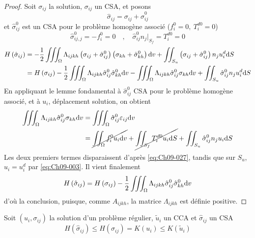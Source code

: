\begin{proof}
    Soit $\sigma_{ij}$ la solution, $\sigma_{ij}$ un CSA, et posons
    \begin{equation}
        \hat{\sigma}_{ij} = \sigma_{ij} + \hat{\sigma}_{ij}^0
        \label{eq:Ch09-026}
    \end{equation}
    et $\hat{\sigma}_{ij}^0$ est un CSA pour le problème homogène associé ($f_i^0 = 0,\ T_i^{d0} = 0$)
    \begin{equation}
        \hat{\sigma}_{ij,j}^0 = -f_i^0 = 0 \quad,\quad \hat{\sigma}_{ij}^0 n_j |_{S_f} = T_i^{d0} = 0
        \label{eq:Ch09-027}
    \end{equation}
    \begin{align*}
        H\left( \hat{\sigma}_{ij} \right) &= - \frac{1}{2} \iiint_{\Omega} \Lambda_{ijkh} \left( \sigma_{ij} + \hat{\sigma}_{ij}^0 \right) \left( \sigma_{kh} + \hat{\sigma}_{kh}^0 \right) \mathrm{d} v + \iint_{S_u} \left( \sigma_{ij} + \hat{\sigma}_{ij}^0 \right) n_j u_i^d \mathrm{d} S \\
        &= H\left( \sigma_{ij} \right) - \frac{1}{2} \iiint_{\Omega} \Lambda_{ijkh} \hat{\sigma}_{ij}^0 \hat{\sigma}_{kh}^0 \mathrm{d} v - \iiint_{\Omega} \Lambda_{ijkh} \hat{\sigma}_{ij}^0 \sigma_{kh} \mathrm{d} v + \iint_{S_u} \hat{\sigma}^0_{ij} n_j u_i^d \mathrm{d} S
    \end{align*}
    En appliquant le lemme fondamental à $\hat{\sigma}_{ij}^0$ CSA pour le problème homogène associé, et à $u_i$, déplacement solution, on obtient
    \begin{align*}
        \iiint_{\Omega} \Lambda_{ijkh} \hat{\sigma}_{ij}^0 \sigma_{kh} \mathrm{d} v &= \iiint_{\Omega} \hat{\sigma}_{ij}^0 \varepsilon_{ij} \mathrm{d} v \\
        &= \cancel{\iint_{\Omega} f_i^0 u_i \mathrm{d} v} + \cancel{\iint_{S_f} T_i^{d0} u_i \mathrm{d} S} + \iint_{S_u} \hat{\sigma}_{ij}^0 n_j u_i \mathrm{d} S
    \end{align*}
    Les deux premiers termes disparaissent d'après \eqref{eq:Ch09-027}, tandis que sur $S_u$, $u_i=u_i^d$ par \eqref{eq:Ch09-003}.
    Il vient finalement 
    \begin{equation}
        H \left( \hat{\sigma}_{ij} \right) = H \left( \sigma_{ij} \right) - \frac{1}{2} \iiint_{\Omega} \Lambda_{ijkh} \hat{\sigma}_{ij}^0 \hat{\sigma}_{kh}^0 \mathrm{d} v
        \label{eq:Ch09-028}
    \end{equation}
    d'où la conclusion, puisque, comme $A_{ijkh}$, la matrice $\Lambda_{ijkh}$ est définie positive.
\end{proof}
\begin{thm}
    Soit $\left( u_i, \sigma_{ij} \right)$ la solution d'un problème régulier, $\tilde{u}_i$ un CCA et $\hat{\sigma}_{ij}$ un CSA
    \begin{equation}
        H \left( \hat{\sigma}_{ij} \right) \leq H \left( \sigma_{ij} \right) = K \left( u_i \right) \leq K \left( \tilde{u}_i \right)
        \label{eq:Ch09-029}
    \end{equation}
\end{thm}

